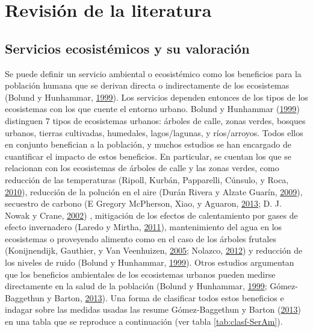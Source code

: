\documentclass[12pt,a4paper,openany]{book}
\theoremstyle{definition}
\theoremstyle{definition}
\theoremstyle{definition}
\theoremstyle{remark}
\begin{document}
\chapter{Revisión de la literatura}\label{revlit}

\section{Servicios ecosistémicos y su
valoración}\label{servicios-ecosistemicos-y-su-valoracion}

Se puede definir un servicio ambiental o ecosistémico como los
beneficios para la población humana que se derivan directa o
indirectamente de los ecosistemas (Bolund y Hunhammar,
\protect\hyperlink{ref-bolund_ecosystem_1999}{1999}). Los servicios
dependen entonces de los tipos de los ecosistemas con los que cuente el
entorno urbano. Bolund y Hunhammar
(\protect\hyperlink{ref-bolund_ecosystem_1999}{1999}) distinguen 7 tipos
de ecosistemas urbanos: árboles de calle, zonas verdes, bosques urbanos,
tierras cultivadas, humedales, lagos/lagunas, y ríos/arroyos. Todos
ellos en conjunto benefician a la población, y muchos estudios se han
encargado de cuantificar el impacto de estos beneficios. En particular,
se cuentan los que se relacionan con los ecosistemas de árboles de calle
y las zonas verdes, como reducción de las temperaturas (Ripoll, Kurbán,
Papparelli, Cúnsulo, y Roca,
\protect\hyperlink{ref-ripoll_condiciones_2010}{2010}), reducción de la
polución en el aire (Durán Rivera y Alzate Guarín,
\protect\hyperlink{ref-duran_rivera_intercepcion_2009}{2009}), secuestro
de carbono (E Gregory McPherson, Xiao, y Aguaron,
\protect\hyperlink{ref-mcpherson2013new}{2013}; D. J. Nowak y Crane,
\protect\hyperlink{ref-nowak_carbon_2002}{2002}) , mitigación de los
efectos de calentamiento por gases de efecto invernadero (Laredo y
Mirtha, \protect\hyperlink{ref-laredo_gestion_2011}{2011}),
mantenimiento del agua en los ecosistemas o proveyendo alimento como en
el caso de los árboles frutales (Konijnendijk, Gauthier, y Van
Veenhuizen, \protect\hyperlink{ref-konijnendijk_arboles_2005}{2005};
Nolazco, \protect\hyperlink{ref-nolazco_diversidad_2012}{2012}) y
reducción de los niveles de ruido (Bolund y Hunhammar,
\protect\hyperlink{ref-bolund_ecosystem_1999}{1999}). Otros estudios
argumentan que los beneficios ambientales de los ecosistemas urbanos
pueden medirse directamente en la salud de la población (Bolund y
Hunhammar, \protect\hyperlink{ref-bolund_ecosystem_1999}{1999};
Gómez-Baggethun y Barton,
\protect\hyperlink{ref-gomez-baggethun_classifying_2013}{2013}). Una
forma de clasificar todos estos beneficios e indagar sobre las medidas
usadas las resume Gómez-Baggethun y Barton
(\protect\hyperlink{ref-gomez-baggethun_classifying_2013}{2013}) en una
tabla que se reproduce a continuación (ver tabla \ref{tab:clasf-SerAm}).
\end{document}
